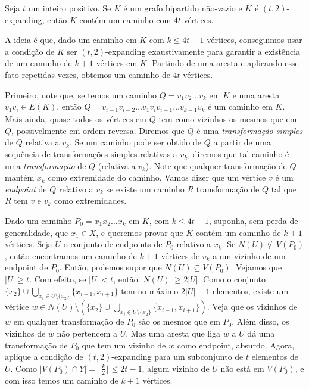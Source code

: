 \begin{prop}
	Seja $t$ um inteiro positivo. Se $K$ é um grafo bipartido não-vazio e $K$ é $(t,2)$-expanding, então $K$ contém um caminho com $4t$ vértices.
\end{prop}

\begin{dem}
	A ideia é que, dado um caminho em $K$ com $k\leq4t-1$ vértices, conseguimos usar a condição de $K$ ser $(t,2)$-expanding exaustivamente para garantir a existência de um caminho de $k+1$ vértices em $K$. Partindo de uma aresta e aplicando esse fato repetidas vezes, obtemos um caminho de $4t$ vértices.
	
	Primeiro, note que, se temos um caminho $Q = v_1v_2\dots v_k$ em $K$ e uma aresta $v_1v_i\in E(K)$, então $\tilde{Q} = v_{i-1}v_{i-2}\dots v_1v_iv_{i+1}\dots v_{k-1}v_k$ é um caminho em $K$. Mais ainda, quase todos os vértices em $\tilde{Q}$ tem como vizinhos os mesmos que em $Q$, possivelmente em ordem reversa. Diremos que $\tilde{Q}$ é uma \emph{transformação simples} de $Q$ relativa a $v_k$. Se um caminho pode ser obtido de $Q$ a partir de uma sequência de transformações simples relativas a $v_k$, diremos que tal caminho é uma \emph{transformação} de $Q$ (relativa a $v_k$). Note que qualquer transformação de $Q$ mantém $x_k$ como extremidade do caminho. Vamos dizer que um vértice $v$ é um \emph{endpoint} de $Q$ relativo a $v_k$ se existe um caminho $R$ transformação de $Q$ tal que $R$ tem $v$ e $v_k$ como extremidades.
	
	Dado um caminho $P_0 = x_1x_2\dots x_k$ em $K$, com $k\leq 4t-1$, suponha, sem perda de generalidade, que $x_1\in X$, e queremos provar que $K$ contém um caminho de $k+1$ vértices. Seja $U$ o conjunto de endpoints de $P_0$ relativo a $x_k$. Se $N(U)\not\subseteq V(P_0)$, então encontramos um caminho de $k+1$ vértices de $v_k$ a um vizinho de um endpoint de $P_0$. Então, podemos supor que $N(U)\subseteq V(P_0)$. Vejamos que $|U|\geq t$. Com efeito, se $|U|<t$, então $|N(U)|\geq2|U|$. Como o conjunto $\{x_2\}\cup\bigcup_{x_i\in U\setminus\{x_2\}}\{x_{i-1}, x_{i+1}\}$ tem no máximo $2|U|-1$ elementos, existe um vértice $w\in N(U)\setminus(\{x_2\}\cup\bigcup_{x_i\in U\setminus\{x_2\}}\{x_{i-1}, x_{i+1}\})$. Veja que os vizinhos de $w$ em qualquer transformação de $P_0$ são os mesmos que em $P_0$. Além disso, os vizinhos de $w$ não pertencem a $U$. Mas uma aresta que liga $w$ a $U$ dá uma transformação de $P_0$ que tem um vizinho de $w$ como endpoint, absurdo.  Agora, aplique a condição de $(t,2)$-expanding para um subconjunto de $t$ elementos de $U$. Como $|V(P_0)\cap Y| = \lfloor\frac{k}{2}\rfloor\leq 2t-1$, algum vizinho de $U$ não está em $V(P_0)$, e com isso temos um caminho de $k+1$ vértices.
	
\end{dem}




